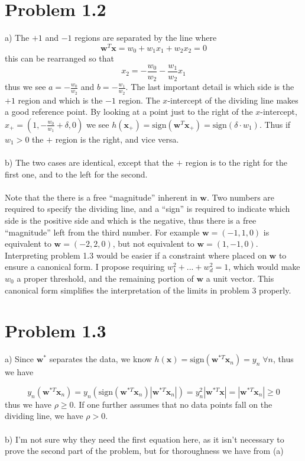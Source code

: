 \documentclass[11pt,letterpaper]{article}
\newcommand{\sign}[0]{\textrm{sign}}
\newcommand{\vv}[1]{\mathbf{#1}} %
\begin{document}
\section*{Problem 1.2}
a) The $+1$ and $-1$ regions are separated by the line where 
\begin{equation*}
    \vv{w}^T\vv{x} = w_0 + w_1 x_1 + w_2 x_2 = 0
\end{equation*}
this can be rearranged so that
\begin{equation*}
    x_2 = -\frac{w_0}{w_2} - \frac{w_1}{w_2}x_1
\end{equation*}
thus we see $a = -\frac{w_0}{w_2}$ and $b = -\frac{w_1}{w_2}$.  The last important detail is which side is the $+1$ region and which is the $-1$ region.  The $x$-intercept of the dividing line makes a good reference point.  By looking at a point just to the right of the $x$-intercept, $x_+ = (1, -\frac{w_0}{w_1} + \delta, 0)$ we see $h(\vv{x_+}) = \sign(\vv{w}^T \vv{x_+}) = \sign(\delta \cdot w_1)$.  Thus if $w_1 > 0$ the $+$ region is the right, and vice versa. \\\\
b) The two cases are identical, except that the $+$ region is to the right for the first one, and to the left for the second.  \\\\
Note that the there is a free ``magnitude'' inherent in $\vv{w}$.  Two numbers are required to specify the dividing line, and a ``sign'' is required to indicate which side is the positive side and which is the negative, thus there is a free ``magnitude'' left from the third number.  For example $\vv{w} = (-1, 1, 0)$ is equivalent to $\vv{w} = (-2, 2, 0)$, but not equivalent to $\vv{w} = (1, -1, 0)$.  Interpreting problem 1.3 would be easier if a constraint where placed on $\vv{w}$ to ensure a canonical form.  I propose requiring $w_1^2 + ... + w_d^2 = 1$, which would make $w_0$ a proper threshold, and the remaining portion of $\vv{w}$ a unit vector.  This canonical form simplifies the interpretation of the limits in problem 3 properly.

\section*{Problem 1.3}

a) Since $\vv{w}^*$ separates the data, we know $h(\vv{x}) = \sign(\vv{w}^{*T}\vv{x}_n) = y_n \; \forall n$, thus we have

\begin{equation*}
    y_n(\vv{w}^{*T}\vv{x}_n) = y_n(\sign(\vv{w}^{*T}\vv{x}_n)|\vv{w}^{*T}\vv{x}_n|) = y_n^2 |\vv{w}^{*T}\vv{x}| = |\vv{w}^{*T}\vv{x}_n| \ge 0
\end{equation*}
thus we have $\rho \ge 0$.  If one further assumes that no data points fall on the dividing line, we have $\rho > 0$.
\\\\
b) I'm not sure why they need the first equation here, as it isn't necessary to prove the second part of the problem, but for thoroughness we have from (a)
\end{document}
